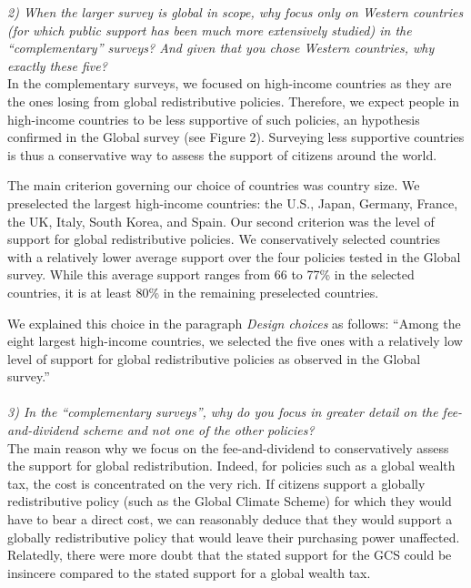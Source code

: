 \documentclass[12pt,english]{article}
\begin{document}
\textit{2) When the larger survey is global in scope, why focus only on Western countries (for which public support has been much more extensively studied) in the “complementary” surveys? And given that you chose Western countries, why exactly these five?}~\\

In the complementary surveys, we focused on high-income countries as they are the ones losing from global redistributive policies. Therefore, we expect people in high-income countries to be less supportive of such policies, an hypothesis confirmed in the Global survey (see Figure 2). Surveying less supportive countries is thus a conservative way to assess the support of citizens around the world. 

The main criterion governing our choice of countries was country size. We preselected the largest high-income countries: the U.S., Japan, Germany, France, the UK, Italy, South Korea, and Spain. Our second criterion was the level of support for global redistributive policies. We conservatively selected countries with a relatively lower average support over the four policies tested in the Global survey. While this average support ranges from 66 to 77\% in the selected countries, it is at least 80\% in the remaining preselected countries.

We explained this choice in the paragraph \textit{Design choices} as follows: ``Among the eight largest high-income countries, we selected the five ones with a relatively low level of support for global redistributive policies as observed in the Global survey.''
~\\ ~\\


\textit{3) In the “complementary surveys”, why do you focus in greater detail on the fee-and-dividend scheme and not one of the other policies?}~\\

The main reason why we focus on the fee-and-dividend to conservatively assess the support for global redistribution. Indeed, for policies such as a global wealth tax, the cost is concentrated on the very rich. If citizens support a globally redistributive policy (such as the Global Climate Scheme) for which they would have to bear a direct cost, we can reasonably deduce that they would support a globally redistributive policy that would leave their purchasing power unaffected. Relatedly, there were more doubt that the stated support for the GCS could be insincere compared to the stated support for a global wealth tax.
\end{document}
